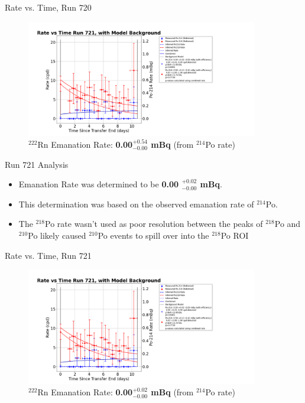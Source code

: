 \documentclass[aspectratio=169]{beamer}
\begin{document}
\begin{frame}{Rate vs. Time, Run 720}
\label{RvT_720}
    \begin{figure}
        \begin{center}
            \includegraphics[width=0.9\textwidth]
            {assets/720/RvT.png}
            \caption{$^{222}$Rn Emanation Rate: 
            \textbf{0.00$^{+0.54}_{-0.00}$ mBq} (from $^{214}$Po rate)}
        \end{center}
    \end{figure}    
\end{frame}

\begin{frame}{Run 721 Analysis}
    \begin{itemize}
        \item Emanation Rate was determined to be \textbf{0.00 $^{+0.02}_{-0.00}$ mBq}.
        \item This determination was based on the observed emanation rate of $^{214}$Po.
        \item The $^{218}$Po rate wasn't used as poor resolution between the peaks of \@
            $^{218}$Po and $^{210}$Po likely caused $^{210}$Po events to spill over\@
            into the $^{218}$Po ROI
    \end{itemize}
\end{frame}

\begin{frame}{Rate vs. Time, Run 721}
    \begin{figure}
        \begin{center}
            \includegraphics[width=0.9\textwidth]
            {assets/721/RvT.png}
            \caption{$^{222}$Rn Emanation Rate: 
            \textbf{0.00$^{+0.02}_{-0.00}$ mBq} (from $^{214}$Po rate)}
        \end{center}
    \end{figure}    
\end{frame}
\end{document}
